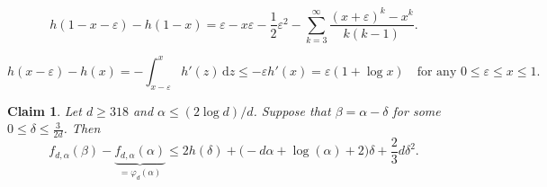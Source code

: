 \documentclass[10pt,a4paper]{amsart}
\newcommand\Coefd{\frac{2}{3}}
\newtheorem{claim}{Claim}
\newcommand\al{\alpha}
\newcommand\be{\beta}
\newcommand\de{\delta}
\newcommand\eps{\varepsilon}
\begin{document}
\begin{equation} \label{eq:h_diff2_simple}
h(1-x-\eps) - h(1-x) 
= \eps - x\eps -\frac12 \eps^2
- \sum_{k=3}^\infty \frac{(x+\eps)^k-x^k}{k(k-1)} .
\end{equation}

\begin{equation} \label{eq:h_diff1}
h(x-\eps) - h(x) 
= - \int_{x-\eps}^x h'(z) \,\mathrm{d}z 
\leq -\eps h'(x) = \eps(1+\log x) 
\quad \text{for any } 0 \leq \eps \leq x \leq 1.
\end{equation}

\begin{claim} \label{cl:f_diff}
Let $d \geq 318$ and $\al \leq (2\log d)/d$. Suppose that $\be=\al-\de$ for some $0\leq \de \leq \frac{3}{2d}$. Then 
%
\begin{equation*}
f_{d,\al}(\be) - \underbrace{f_{d,\al}(\al)}_{=\varphi_d(\al)} 
\leq 2 h(\de) 
+ \big( -d\al + \log(\al) + 2 \big) \de 
+ \Coefd d \de^2 .
\end{equation*}
%
\end{claim}
\end{document}
